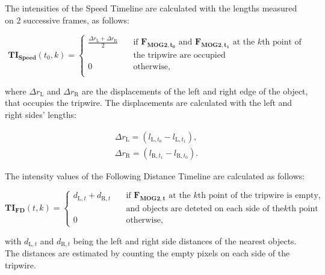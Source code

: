The intensities of the Speed Timeline are calculated with the lengths measured on 2 successive frames, as follows:

\begin{displaymath}
\boldsymbol{TI_{\text{Speed}}}(t_0,k) = 
\begin{cases}
\frac{\Delta r_{\text{L}} + \Delta r_{\text{R}}}{2}      & \quad \text{if } \boldsymbol{F_{\text{MOG2},t_0}} \text{ and } \boldsymbol{F_{\text{MOG2},t_1}} \text{ at the } k\text{th} \text{ point of} \\ & \quad \text{the tripwire are occupied}\\
0		& \quad \text{otherwise,}\\
\end{cases}
\end{displaymath}
 
where $\Delta r_{\text{L}}$ and $\Delta r_{\text{R}}$ are the displacements of the left and right edge of the object, that occupies the tripwire.
The displacements are calculated with the left and right sides' lengths:
 
\begin{gather*}
\Delta r_{\text{L}} = \left( l_{\text{L},t_0} - l_{\text{L},t_1} \right),  \\
\Delta r_{\text{R}} = \left( l_{\text{R},t_1} - l_{\text{R},t_0}\right).
\end{gather*}

The intensity values of the Following Distance Timeline are calculated as follows:

\begin{displaymath}
\boldsymbol{TI_{\text{FD}}}(t,k) = 
\begin{cases}
d_{\text{L},t} + d_{\text{R},t} 		& \quad \text{if } \boldsymbol{F_{\text{MOG2},t}} \text{ at the } k\text{th} \text{ point of the tripwire is empty,} \\ & \quad \text{and objects are deteted on each side of the} k \text{th point}\\
0		& \quad \text{otherwise},
\end{cases}
\end{displaymath}

with $d_{\text{L},t}$ and $d_{\text{R},t}$ being the left and right side distances of the nearest objects.
The distances are estimated by counting the empty pixels on each side of the tripwire.

